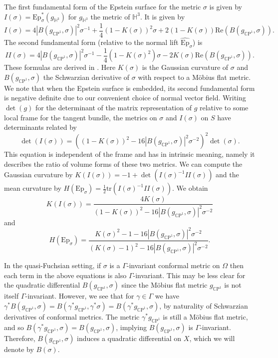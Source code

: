 \documentclass{amsart}
\newcommand{\CP}{\mathbb{C}\mathrm{P}}
\renewcommand{\H}{\mathbb{H}}
\newcommand{\two}{I\!\!I}
\begin{document}
The first fundamental form of the Epstein surface for the metric $\sigma$ is given by $I(\sigma) = \mathrm{Ep}_\sigma^*(g_{\H^3})$ for $g_{\H^3}$ the metric of $\H^3$. 
It is given by 
\[
I(\sigma) = 4|B(g_{\CP^1},\sigma)|^2\sigma^{-1} + \frac{1}{4}(1-K(\sigma))^2\sigma + 2(1-K(\sigma))\text{Re}(B(g_{\CP^1},\sigma)).
\]
The second fundamental form (relative to the normal lift $\widehat{\mathrm{Ep}}_\sigma$) is 
\[
\two(\sigma)
= 4|B(g_{\CP^1},\sigma)|^2\sigma^{-1} - \frac{1}{4} (1 - K(\sigma)^2)\sigma - 2 K(\sigma) \text{Re}(B(g_{\CP^1},\sigma)).
\]
These formulas are derived in \cite[Eqns.~3.2-3.3]{dumas2017}.
Here $K(\sigma)$ is the Gaussian curvature of $\sigma$ and $B(g_{\CP^1},\sigma)$ the Schwarzian derivative of $\sigma$ with respect to a M\"obius flat metric. 
We note that when the Epstein surface is embedded, its second fundamental form is negative definite due to our convenient choice of normal vector field.
Writing $\det(g)$ for the determinant of the matrix representation of $g$ relative to some local frame for the tangent bundle, the metrics on $\sigma$ and $I(\sigma)$ on $S$ have determinants related by
\[
\det(I(\sigma)) = \left( (1-K(\sigma))^2 - 16 |B(g_{\CP^1},\sigma)|^2\sigma^{-2} \right)^2 \det(\sigma).
\]
This equation is independent of the frame and has in intrinsic meaning, namely it describes the ratio of volume forms of these two metrics. 
We can compute the Gaussian curvature by $K(I(\sigma)) = -1 + \det(I(\sigma)^{-1}\two(\sigma))$ and the mean curvature by $H(\mathrm{Ep}_\sigma) = \frac{1}{2}\mathrm{tr}(I(\sigma)^{-1}\two(\sigma))$. 
We obtain
\[
K(I(\sigma))
= \frac{4K(\sigma)}{(1-K(\sigma))^2 - 16|B(g_{\CP^1},\sigma)|^2\sigma^{-2}}
\]
and
\[
H(\mathrm{Ep}_\sigma)
= \frac{K(\sigma)^2 - 1 - 16 |B(g_{\CP^1},\sigma)|^2\sigma^{-2}}{(K(\sigma) - 1)^2 - 16 |B(g_{\CP^1},\sigma)|^2\sigma^{-2}}.
\]

 
In the quasi-Fuchsian setting, if $\sigma$ is a $\Gamma$-invariant conformal metric on $\Omega$ then each term in the above equations is also $\Gamma$-invariant. 
This may be less clear for the quadratic differential $B(g_{\CP^1},\sigma)$ since the M\"obius flat metric $g_{\CP^1}$ is not itself $\Gamma$-invariant. 
However, we see that for $\gamma \in \Gamma$ we have $\gamma^*B(g_{\CP^1},\sigma) = B(\gamma^*g_{\CP^1},\gamma^*\sigma) = B(\gamma^* g_{\CP^1},\sigma)$, by naturality of Schwarzian derivatives of conformal metrics. 
The metric $\gamma^* g_{\CP^1}$ is still a M\"obius flat metric, and so $B(\gamma^* g_{\CP^1},\sigma) = B(g_{\CP^1},\sigma)$, implying $B(g_{\CP^1}, \sigma)$ is $\Gamma$-invariant. 
Therefore, $B(g_{\CP^1},\sigma)$ induces a quadratic differential on $X$, which we will denote by $B(\sigma)$.
\end{document}
